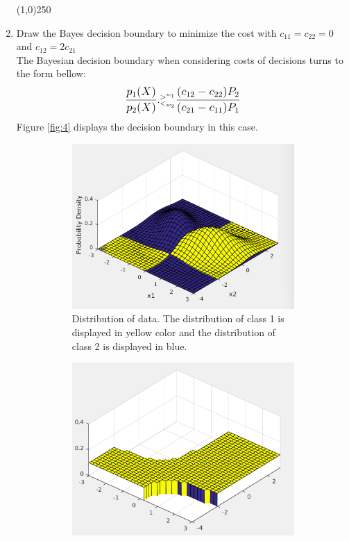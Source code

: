 \documentclass[12pt]{article}
\begin{document}
\begin{enumerate}
\begin{center}
\line(1,0){250}
\end{center}

\item Draw the Bayes decision boundary to minimize the cost with $c_{11} = c_{22} = 0$ and
$c_{12} = 2c_{21}$ \\
The Bayesian decision boundary when considering costs of decisions turns to the form bellow:
\begin{equation}
\mathlarger{\frac{p_1(X)}{p_2(X)}} .^{>^{w_1}}_{<_{w_2}} \mathlarger{\frac{(c_{12} - c_{22})P_2}{(c_{21} - c_{11})P_1}}
\label{eq:1-1}
\end{equation}
Figure \ref{fig:4} displays the decision boundary in this case.


\begin{figure}[h]
\centering
\begin{subfigure}{0.4\textwidth}
\includegraphics[scale=0.3]{Imgs/1-2-1.png}
\caption{Distribution of data. The distribution of class 1 is displayed in yellow color and the distribution of class 2 is displayed in blue.}
\end{subfigure}
\begin{subfigure}{0.4\textwidth}
\includegraphics[scale=0.3]{Imgs/1-2-2.png}

\end{subfigure}
\end{figure}
\end{enumerate}
\end{document}
